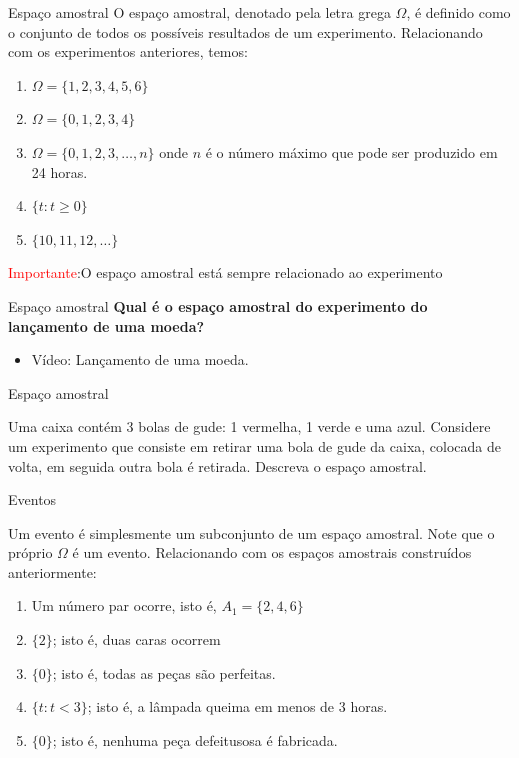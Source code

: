 \begin{frame}{Espaço amostral}
    O espaço amostral, denotado pela letra grega $\Omega$, é definido como o conjunto de todos os possíveis resultados de um experimento. Relacionando com os experimentos anteriores, temos:
    \begin{exemplo}
        \begin{enumerate}
            \item $\Omega =\{1, 2, 3, 4, 5, 6\}$
            \item  $\Omega =\{0, 1, 2, 3, 4\}$
            \item $\Omega =\{0, 1, 2, 3 , \dots, n\}$ onde $n$ é o número máximo que pode ser produzido em 24 horas.
            \item $\{t : t \geq 0\}$
            \item $\{10, 11, 12, \dots\}$
        \end{enumerate}
    \end{exemplo}
\textcolor{red}{Importante}:O espaço amostral está sempre relacionado ao experimento
\end{frame}

\begin{frame}{Espaço amostral}
    \textbf{Qual é o espaço amostral do experimento do lançamento de uma moeda?}

    \begin{itemize}
        \item Vídeo: Lançamento de uma moeda.
    \end{itemize}
\end{frame}
\begin{frame}{Espaço amostral}
    \begin{exemplo}
        Uma caixa contém 3 bolas de gude: 1 vermelha, 1 verde e uma azul. Considere um experimento que consiste em retirar uma bola de gude da caixa, colocada de volta, em seguida outra bola é retirada. Descreva o espaço amostral.
    \end{exemplo}
\end{frame}
\begin{frame}{Eventos}

Um evento é simplesmente um subconjunto de um espaço amostral. Note que o próprio $\Omega$ é um evento. Relacionando com os espaços amostrais construídos anteriormente:

\begin{exemplo}
    \begin{enumerate}
        \item Um número par ocorre, isto é, $A_1= \{2,4,6\}$
        \pause
        \item $\{2\}$; isto é, duas caras ocorrem
        \pause
        \item $\{0\}$; isto é, todas as peças são perfeitas.
        \pause
        \item $\{t : t < 3\}$; isto é, a lâmpada queima em menos de 3 horas.
        \pause
        \item $\{0\}$; isto é, nenhuma peça defeitusosa é fabricada. 
    \end{enumerate}
\end{exemplo}
    
\end{frame}

